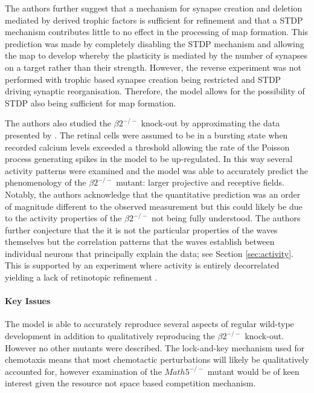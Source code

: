 The authors further suggest that a mechanism for synapse creation and deletion mediated by derived trophic factors is sufficient for refinement and that a STDP mechanism contributes little to no effect in the processing of map formation. This prediction was made by completely disabling the STDP mechanism and allowing the map to develop whereby the plasticity is mediated by the number of synapses on a target rather than their strength. However, the reverse experiment was not performed with trophic based synapse creation being restricted and STDP driving synaptic reorganisation. Therefore, the model allows for the possibility of STDP also being sufficient for map formation.

The authors also studied the $\beta2^{-/-}$ knock-out by approximating the data presented by \cite{Stafford2009, McLaughlin2003-nf}. The retinal cells were assumed to be in a bursting state when recorded calcium levels exceeded a threshold allowing the rate of the Poisson process generating spikes in the model to be up-regulated. In this way several activity patterns were examined and the model was able to accurately predict the phenomenology of the $\beta2^{-/-}$ mutant: larger projective and receptive fields. Notably, the authors acknowledge that the quantitative prediction was an order of magnitude different to the observed measurement but this could likely be due to the activity properties of the $\beta2^{-/-}$ not being fully understood. The authors further conjecture that the it is not the particular properties of the waves themselves but the correlation patterns that the waves establish between individual neurons that principally explain the data; see Section \ref{sec:activity}. This is supported by an experiment where activity is entirely decorrelated yielding a lack of retinotopic refinement \cite{McLaughlin2003-yy}.
\paragraph{Key Issues}
The model is able to accurately reproduce several aspects of regular wild-type development in addition to qualitatively reproducing the $\beta2^{-/-}$ knock-out. However no other mutants were described. The lock-and-key mechanism used for chemotaxis means that most chemotactic perturbations will likely be qualitatively accounted for, however examination of the $Math5^{-/-}$ mutant would be of keen interest given the resource not space based competition mechanism.

